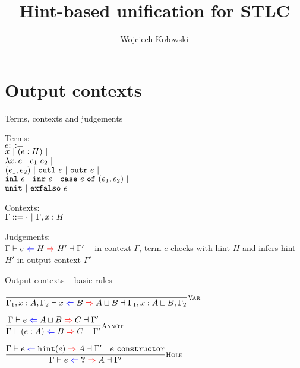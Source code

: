 \documentclass{beamer}
\title{Hint-based unification for STLC}
\author{Wojciech Kołowski}
\date{}
\begin{document}
\frame{\titlepage}

\section{Output contexts}

\begin{frame}{Terms, contexts and judgements}

Terms: \\
$e ::=$ \\
\qquad $x \ |\  (e : H) \ |\  $ \\
\qquad $\lambda x.\, e \ |\  e_1\ e_2 \ |\ $ \\
\qquad $(e_1, e_2) \ |\  \texttt{outl}\ e \ |\  \texttt{outr}\ e \ |\ $ \\
\qquad $\texttt{inl}\ e \ |\  \texttt{inr}\ e \ |\  \texttt{case}\ e\ \texttt{of}\ (e_1, e_2) \ |\ $ \\
\qquad $\texttt{unit} \ |\  \texttt{exfalso}\ e$

\vspace{1em}

Contexts: \\
$\Gamma ::= \cdot \ |\  \Gamma, x : H$

\vspace{2em}

Judgements: \\
$\fulloutctx{\Gamma}{e}{H}{H'}{\Gamma'}$ -- in context $\Gamma$, term $e$ checks with hint $H$ and infers hint $H'$ in output context $\Gamma'$

\end{frame}

\begin{frame}{Output contexts -- basic rules}

\begin{center}
  $\infrule[Var]{}{\fulloutctx{\Gamma_1, x : A, \Gamma_2}{x}{B}{\hintlub{A}{B}}{\Gamma_1, x : \hintlub{A}{B}, \Gamma_2}}$

  \vspace{2em}

  $\infrule[Annot]{\outctx{e}{\hintlub{A}{B}}{C}}{\outctx{\annot{e}{A}}{B}{C}}$

  \vspace{2em}

  $\infrule[Hole]{\outctx{e}{\hintfor{e}}{A} \quad \sidecond{e\ \texttt{constructor}}}{\outctx{e}{\Hole}{A}}$
\end{center}

\end{frame}
\end{document}
